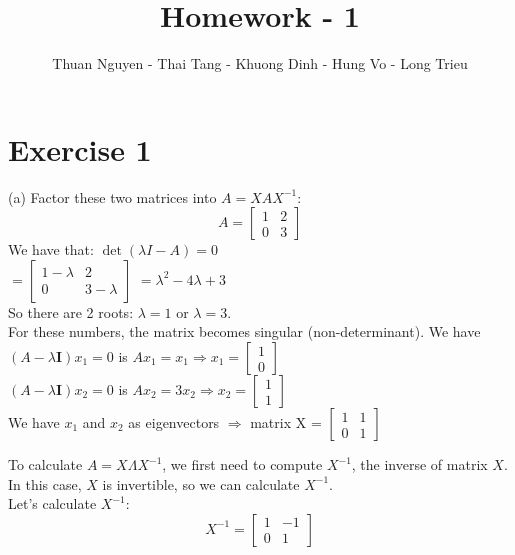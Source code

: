 \documentclass{article}
\title{Homework - 1}
\author{Thuan Nguyen - Thai Tang - Khuong Dinh - Hung Vo - Long Trieu}
\begin{document}
\maketitle

\section{Exercise 1}

(a) Factor these two matrices into $A = XAX^{-1}$:
\[
A = 
\begin{bmatrix}
    1 & 2 \\
    0 & 3
\end{bmatrix}
\]
We have that: $\det(\lambda I-A) = 0$ \\
$= \begin{bmatrix}
    1 -\lambda & 2 \\
    0 & 3 -\lambda
\end{bmatrix}$ 
$=\lambda^2 - 4\lambda + 3$
\\So there are 2 roots: $\lambda = 1$ or $\lambda = 3$.    
\\For these numbers, the matrix becomes singular (non-determinant). We have
\( (A - \lambda \mathbf{I}) x_1 = 0 \) is \( A x_1 = x_1 \Rightarrow x_1 = \begin{bmatrix}
    1 \\
    0
\end{bmatrix} \)
\\
\( (A - \lambda \mathbf{I}) x_2 = 0 \) is \( A x_2 = 3 x_2 \Rightarrow x_2 = \begin{bmatrix}
    1 \\
    1
\end{bmatrix} \)
\\ 
We have \(x_1\) and \(x_2\) as eigenvectors \(\Rightarrow\) matrix X = \(\begin{bmatrix}
    1  & 1\\
    0 & 1
\end{bmatrix}\)

To calculate \(A = X \Lambda X^{-1}\), we first need to compute \(X^{-1}\), the inverse of matrix \(X\). In this case, \(X\) is invertible, so we can calculate \(X^{-1}\).
\\Let's calculate \( X^{-1} \):
\[
X^{-1} = \begin{bmatrix}
    1 & -1 \\
    0 & 1
\end{bmatrix}
\]
\end{document}
